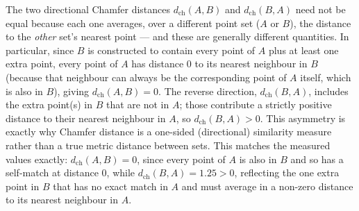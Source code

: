 \documentclass[11pt]{article}
\begin{document}
The two directional Chamfer distances $d_{\text{ch}}(A,B)$ and $d_{\text{ch}}(B,A)$ need not
be equal because each one averages, over a different point set ($A$ or $B$), the distance to
the \emph{other} set's nearest point --- and these are generally different quantities. In
particular, since $B$ is constructed to contain every point of $A$ plus at least one extra
point, every point of $A$ has distance $0$ to its nearest neighbour in $B$ (because that
neighbour can always be the corresponding point of $A$ itself, which is also in $B$), giving
$d_{\text{ch}}(A,B) = 0$. The reverse direction, $d_{\text{ch}}(B,A)$, includes the extra
point(s) in $B$ that are not in $A$; those contribute a strictly positive distance to their
nearest neighbour in $A$, so $d_{\text{ch}}(B,A) > 0$. This asymmetry is exactly why Chamfer
distance is a one-sided (directional) similarity measure rather than a true metric distance
between sets. This matches the measured values exactly: $d_{\text{ch}}(A,B) = 0$, since every
point of $A$ is also in $B$ and so has a self-match at distance $0$, while
$d_{\text{ch}}(B,A) = 1.25 > 0$, reflecting the one extra point in $B$ that has no exact match
in $A$ and must average in a non-zero distance to its nearest neighbour in $A$.
\end{document}
